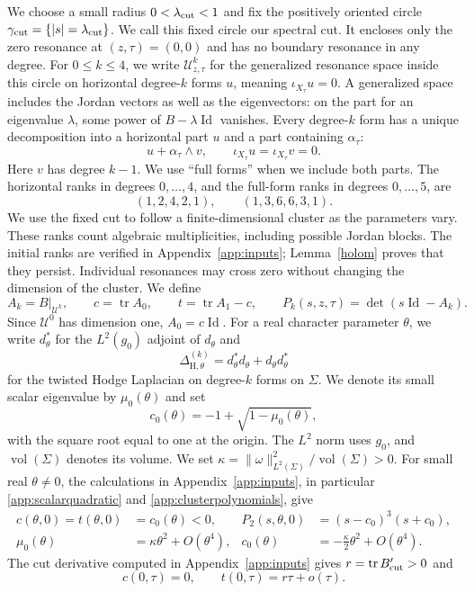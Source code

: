 \documentclass[11pt,letterpaper,reqno]{amsart}
\theoremstyle{remark}
\newcommand{\Id}{\operatorname{Id}}
\newcommand{\tr}{\operatorname{tr}}
\newcommand{\vol}{\operatorname{vol}}
\newcommand{\cU}{\mathcal U}
\begin{document}
We choose a small radius $0<\lambda_{\rm cut}<1$ and fix the positively
oriented circle $\gamma_{\rm cut}=\{|s|=\lambda_{\rm cut}\}$.
We call this fixed circle our spectral cut.
It encloses only the zero resonance at $(z,\tau)=(0,0)$ and has no
boundary resonance in any degree. For $0\leq k\leq4$, we write
$\cU^k_{z,\tau}$ for the
generalized resonance space inside this circle on horizontal
degree-$k$ forms $u$, meaning $\iota_{X_\tau}u=0$.
A generalized space includes the Jordan vectors as well as the eigenvectors:
on the part for an eigenvalue $\lambda$, some power of
$B-\lambda\Id$ vanishes.
Every degree-$k$ form has a unique decomposition into a horizontal
part $u$ and a part containing $\alpha_\tau$:
\[
 u+\alpha_\tau\wedge v,\qquad
 \iota_{X_\tau}u=\iota_{X_\tau}v=0.
\]
Here $v$ has degree $k-1$. We use ``full forms'' when we include both parts.
The horizontal ranks in degrees $0,\ldots,4$, and the full-form
ranks in degrees $0,\ldots,5$, are
\begin{equation}\label{ranks}
 (1,2,4,2,1),\qquad (1,3,6,6,3,1).
\end{equation}
We use the fixed cut to follow a finite-dimensional cluster as the
parameters vary. These ranks count algebraic multiplicities, including
possible Jordan blocks. The initial ranks are verified in
Appendix~\ref{app:inputs}; Lemma~\ref{holom} proves that they persist.
Individual
resonances may cross zero without changing the dimension of the cluster.
We define
\[
 A_k=B|_{\cU^k},\qquad c=\tr A_0,\qquad t=\tr A_1-c,
 \qquad P_k(s,z,\tau)=\det(s\Id-A_k).
\]
Since $\cU^0$ has dimension one, $A_0=c\Id$.
For a real character parameter $\theta$, we write $d_\theta^*$ for the
$L^2(g_0)$ adjoint of $d_\theta$ and
\[
 \Delta_{\mathrm H,\theta}^{(k)}=d_\theta^*d_\theta+d_\theta d_\theta^*
\]
for the twisted Hodge Laplacian on degree-$k$ forms on $\Sigma$.
We denote its small scalar eigenvalue by $\mu_0(\theta)$ and set
\[
 c_0(\theta)=-1+\sqrt{1-\mu_0(\theta)},
\]
with the square root equal to one at the origin. The $L^2$ norm uses $g_0$, and
$\vol(\Sigma)$ denotes its volume. We set
$\kappa=\|\omega\|_{L^2(\Sigma)}^2/\vol(\Sigma)>0$.
For small real $\theta\ne0$, the calculations in Appendix~\ref{app:inputs},
in particular \eqref{app:scalarquadratic} and
\eqref{app:clusterpolynomials}, give
\begin{align}\label{hyper}
 c(\theta,0)=t(\theta,0)&=c_0(\theta)<0,
 &P_2(s,\theta,0)&=(s-c_0)^3(s+c_0),\\
 \mu_0(\theta)&=\kappa\theta^2+O(\theta^4),
 &c_0(\theta)&=-\tfrac\kappa2\theta^2+O(\theta^4).\label{quadratic}
\end{align}
The cut derivative computed in Appendix~\ref{app:inputs} gives
$r=\tr B'_{\rm cut}>0$ and
\begin{equation}\label{taxis}
 c(0,\tau)=0,\qquad t(0,\tau)=r\tau+o(\tau).
\end{equation}
\end{document}
